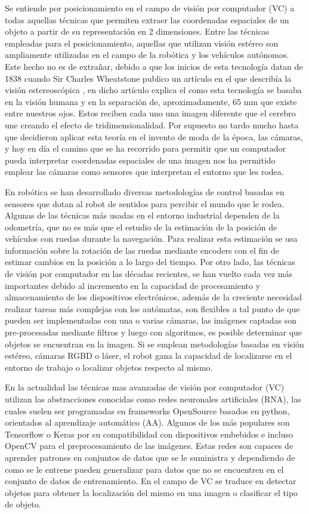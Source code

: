 Se entiende por posicionamiento en el campo de visión por computador (VC) a todas aquellas técnicas que permiten extraer las coordenadas espaciales de un objeto a partir de su representación en 2 dimensiones. Entre las técnicas empleadas para el posicionamiento, aquellas que utilizan visión estéreo son ampliamente utilizadas en el campo de la robótica y los vehículos autónomos. Este hecho no es de extrañar, debido a que los inicios de esta tecnología datan de 1838 cuando Sir Charles Wheatstone publico un artículo en el que describía la visión estereoscópica \cite{Wheatstone1837}, en dicho artículo explica el como esta tecnología se basaba en la visión humana y en la separación de, aproximadamente, 65 mm que existe entre nuestros ojos. Estos reciben cada uno una imagen diferente que el cerebro une creando el efecto de tridimensionalidad. Por supuesto no tardo mucho hasta que decidieron aplicar esta teoría en el invento de moda de la época, las cámaras, y hoy en día el camino que se ha recorrido para permitir que un computador pueda interpretar coordenadas espaciales de una imagen nos ha permitido emplear las cámaras como sensores que interpretan el entorno que les rodea. 

En robótica se han desarrollado diversas metodologías de control basadas en sensores que dotan al robot de sentidos para percibir el mundo que le rodea. Algunas de las técnicas más usadas en el entorno industrial dependen de la odometría, que no es más que el estudio de la estimación de la posición de vehículos con ruedas durante la navegación. Para realizar esta estimación se usa información sobre la rotación de las ruedas mediante encoders con el fin de estimar cambios en la posición a lo largo del tiempo. Por otro lado, las técnicas de visión por computador en las décadas recientes, se han vuelto cada vez más importantes debido al incremento en la capacidad de procesamiento y almacenamiento de los dispositivos electrónicos, además de la creciente necesidad realizar tareas más complejas con los autómatas, son flexibles a tal punto de que pueden ser implementadas con una o varias cámaras, las imágenes captadas son pre-procesadas mediante filtros y luego con algoritmos, es posible determinar que objetos se encuentran en la imagen. Si se emplean metodologías basadas en visión estéreo, cámaras RGBD o láser, el robot gana la capacidad de localizarse en el entorno de trabajo o localizar objetos respecto al mismo.

En la actualidad las técnicas mas avanzadas de visión por computador (VC) utilizan las abstracciones conocidas como redes neuronales artificiales (RNA), las cuales suelen ser programadas en frameworks OpenSource basados en python, orientados al aprendizaje automático (AA). Algunos de los más populares son Tensorflow o Keras por su compatibilidad con dispositivos embebidos e incluso OpenCV para el preprocesamiento de las imágenes. Estas redes son capaces de aprender patrones en conjuntos de datos que se le suministra y dependiendo de como se le entrene pueden generalizar para datos que no se encuentren en el conjunto de datos de entrenamiento. En el campo de VC se traduce en detectar objetos para obtener la localización del mismo en una imagen o clasificar el tipo de objeto.

